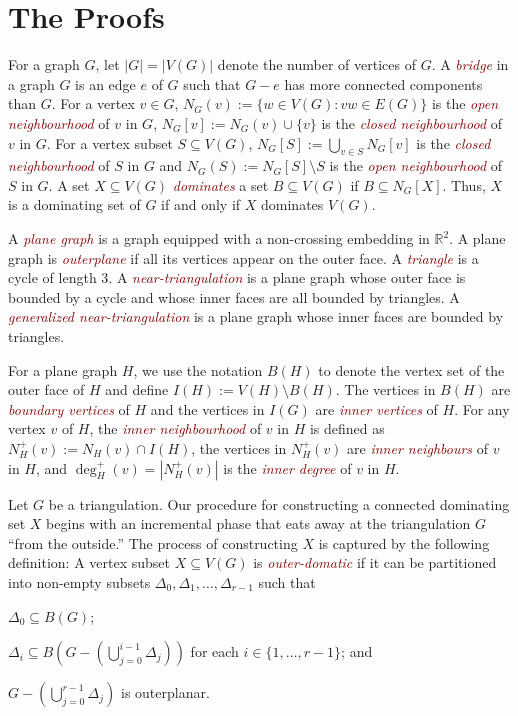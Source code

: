 \documentclass[12pt]{article}
\newtheorem{thm}{Theorem}
\newcommand{\defin}[1]{\emph{\textcolor{Maroon}{#1}}}
\begin{document}


\section{The Proofs}

For a graph $G$, let $|G|=|V(G)|$ denote the number of vertices of $G$.  A \defin{bridge} in a graph $G$ is an edge $e$ of $G$ such that $G-e$ has more connected components than $G$.  For a vertex $v\in G$, $N_G(v):=\{w\in V(G):vw\in E(G)\}$ is the \defin{open neighbourhood} of $v$ in $G$,  $N_G[v]:=N_G(v)\cup\{v\}$ is the \defin{closed neighbourhood} of $v$ in $G$.  For a vertex subset $S\subseteq V(G)$, $N_G[S]:=\bigcup_{v\in S} N_{G}[v]$ is the \defin{closed neighbourhood} of $S$ in $G$ and $N_G(S):=N_G[S]\setminus S$ is the \defin{open neighbourhood} of $S$ in $G$.  A set $X\subseteq V(G)$ \defin{dominates} a set $B\subseteq V(G)$ if $B\subseteq N_G[X]$.  Thus, $X$ is a dominating set of $G$ if and only if $X$ dominates $V(G)$.

A \defin{plane graph} is a graph equipped with a non-crossing embedding in $\mathbb{R}^2$.  A plane graph is \defin{outerplane} if all its vertices appear on the outer face.  A \defin{triangle} is a cycle of length $3$. A \defin{near-triangulation} is a plane graph whose outer face is bounded by a cycle and whose inner faces are all bounded by triangles.  A \defin{generalized near-triangulation} is a plane graph whose inner faces are bounded by triangles.


For a plane graph $H$, we use the notation $B(H)$ to denote the vertex set of the outer face of $H$ and define $I(H):=V(H)\setminus B(H)$.  The vertices in $B(H)$ are \defin{boundary vertices} of $H$ and the vertices in $I(G)$ are \defin{inner vertices} of $H$. For any vertex $v$ of $H$, the \defin{inner neighbourhood} of $v$ in $H$ is defined as $N_H^+(v):=N_H(v)\cap I(H)$, the vertices in $N^+_H(v)$ are \defin{inner neighbours} of $v$ in $H$, and $\deg^+_H(v)=|N^+_H(v)|$ is the \defin{inner degree} of $v$ in $H$.

Let $G$ be a triangulation.  Our procedure for constructing a connected dominating set $X$ begins with an incremental phase that eats away at the triangulation $G$ ``from the outside.'' The process of constructing $X$ is captured by the following definition:   A vertex subset $X\subseteq V(G)$ is \defin{outer-domatic} if it can be partitioned into non-empty subsets $\Delta_0,\Delta_1,\ldots,\Delta_{r-1}$ such that
\begin{compactenum}[(P1)]
    \item $\Delta_0\subseteq B(G)$; \label{outer_face}
    \item $\Delta_i\subseteq B(G-(\bigcup_{j=0}^{i-1}\Delta_j))$ for each $i\in\{1,\ldots,r-1\}$; and \label{incremental}
    \item $G-(\bigcup_{j=0}^{r-1}\Delta_j)$ is outerplanar. \label{outerplanar}
\end{compactenum}
\end{document}
